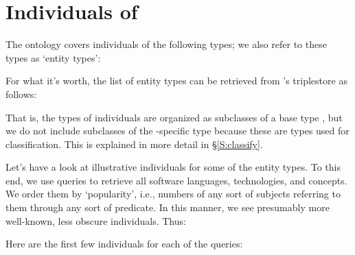
\section{Individuals of \solasote}
\label{S:entities}

The ontology covers individuals of the following types; we also refer
to these types as `entity types':


\noindent
For what it's worth, the list of entity types can be retrieved from
\solasote's triplestore as follows:


\noindent
That is, the types of individuals are organized as subclasses of a
base type , but we do not include subclasses of the
\solasote-specific type  because these are types
used for classification. This is explained in more detail in
\S\ref{S:classify}.

Let's have a look at illustrative individuals for some of the entity types. To this end, we use queries to retrieve all software languages, technologies, and concepts. We order them by `popularity', i.e., numbers of any sort of subjects referring to them through any sort of predicate. In this manner, we see presumably more well-known, less obscure individuals. Thus:




\noindent
Here are the first few individuals for each of the queries:





